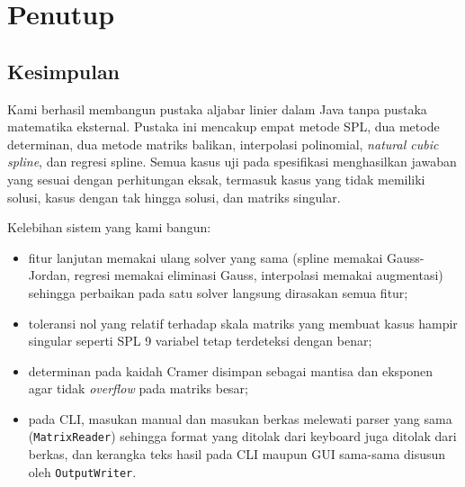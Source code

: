 \clearpage
\section{Penutup}

\subsection{Kesimpulan}

Kami berhasil membangun pustaka aljabar linier dalam Java tanpa pustaka matematika eksternal. Pustaka ini mencakup empat metode SPL, dua metode determinan, dua metode matriks balikan, interpolasi polinomial, \textit{natural cubic spline}, dan regresi spline. Semua kasus uji pada spesifikasi menghasilkan jawaban yang sesuai dengan perhitungan eksak, termasuk kasus yang tidak memiliki solusi, kasus dengan tak hingga solusi, dan matriks singular.

Kelebihan sistem yang kami bangun:
\begin{itemize}[nosep]
  \item fitur lanjutan memakai ulang solver yang sama (spline memakai Gauss-Jordan, regresi memakai eliminasi Gauss, interpolasi memakai augmentasi) sehingga perbaikan pada satu solver langsung dirasakan semua fitur;
  \item toleransi nol yang relatif terhadap skala matriks yang membuat kasus hampir singular seperti SPL 9 variabel tetap terdeteksi dengan benar;
  \item determinan pada kaidah Cramer disimpan sebagai mantisa dan eksponen agar tidak \textit{overflow} pada matriks besar;
  \item pada CLI, masukan manual dan masukan berkas melewati parser yang sama (\texttt{MatrixReader}) sehingga format yang ditolak dari keyboard juga ditolak dari berkas, dan kerangka teks hasil pada CLI maupun GUI sama-sama disusun oleh \texttt{OutputWriter}.
\end{itemize}

